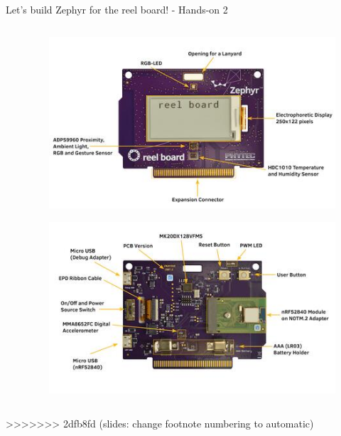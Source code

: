 \documentclass[10pt, aspectratio=169]{beamer}
\begin{document}
\begin{frame}[fragile]{Let's build Zephyr for the reel board! - Hands-on 2}
\begin{columns}
\begin{column}{0.6\textwidth}
    \end{column}
    \begin{column}{0.4\textwidth}
      \begin{figure}
        \includegraphics[width=.9\textwidth]{images/reel_board.jpg}
      \end{figure}
      \begin{figure}
        \includegraphics[width=.9\textwidth]{images/reel_board_descr_back.jpg}
      \end{figure}
    \end{column}
  \end{columns}
\end{frame}
>>>>>>> 2dfb8fd (slides: change footnote numbering to automatic)
\end{document}
